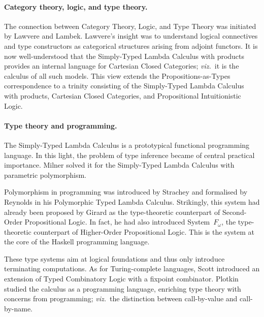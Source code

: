 \documentclass[11pt,twocolumn]{article}
\newcommand{\viz}{\emph{viz.}}
\newcommand{\lcalculus}{\mbox{$\lambda$-calculus}}
\newcommand{\SystemFomega}{\mbox{System~$F_\omega$}}
\begin{document}
\paragraph*{Category theory, logic, and type theory.}

The connection between Category Theory, Logic, and Type Theory was
initiated by Lawvere %
and Lambek. %
%
Lawvere's insight was to understand logical connectives and type constructors
as categorical structures arising from adjoint functors.  It is now
well-understood that the Simply-Typed Lambda Calculus with products provides
an internal language for Cartesian Closed Categories; \viz~it is the
calculus of all such models.  This view extends the Propositions-as-Types
correspondence to a trinity consisting of the Simply-Typed Lambda Calculus
with products, Cartesian Closed Categories, and Propositional
Intuitionistic Logic.

\paragraph*{Type theory and programming.}

The Simply-Typed Lambda Calculus is a prototypical functional programming
language.  In this light, the problem of type inference became of central
practical importance.  Milner %
solved it for the Simply-Typed Lambda Calculus with parametric polymorphism.  
 
Polymorphism in programming was introduced by Strachey %
and formalised by Reynolds %
in his Polymorphic Typed Lambda Calculus.
Strikingly, this system had already been proposed by
Girard %
as the type-theoretic counterpart of Second-Order Propositional Logic. 
In fact, he %
had also introduced {\SystemFomega}, the type-theoretic counterpart of
Higher-Order Propositional Logic.  
This is the system %
at the core of the Haskell programming language. 

These type systems aim at logical foundations and thus only introduce
terminating computations.  As for Turing-complete languages, 
Scott %
introduced an extension of Typed Combinatory Logic with a fixpoint combinator. 
Plotkin %
studied the calculus as a programming language, enriching type
theory with concerns from programming; \viz~the distinction between
call-by-value and call-by-name. %
\end{document}
